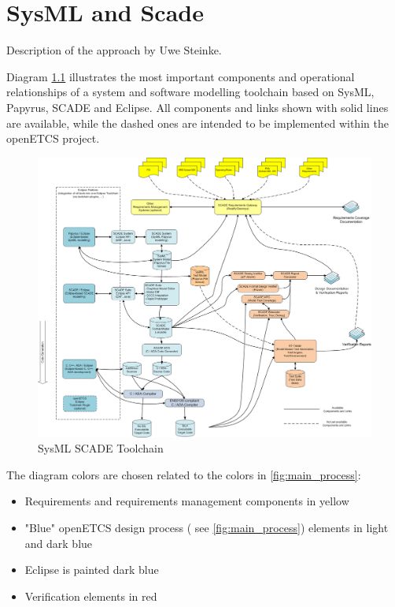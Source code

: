 \chapter{SysML and Scade}
\label{sec:sysML-Scade}

\begin{todo_comment}
Description of the approach by Uwe Steinke.
\end{todo_comment}

Diagram \ref{fig:SysML_SCADE_Toolchain} illustrates the most important components and operational relationships of a system and software modelling toolchain based on SysML, Papyrus, SCADE and Eclipse. 
All components and links shown with solid lines are available, while the dashed ones are intended to be implemented within the openETCS project. 


\begin{figure}[htbp]
	\centering
		\includegraphics[width=1.10\textwidth]{images/SysML_SCADE_Toolchain.png}
	\caption{SysML SCADE Toolchain}
	\label{fig:SysML_SCADE_Toolchain}
\end{figure}


The diagram colors are chosen related to the colors in \ref{fig:main_process}: 

\begin{itemize}
	\item Requirements and requirements management components in yellow
	\item "Blue" openETCS design process ( see \ref{fig:main_process}) elements in light and dark blue
	\item Eclipse is painted dark blue
	\item Verification elements in red
\end{itemize}

